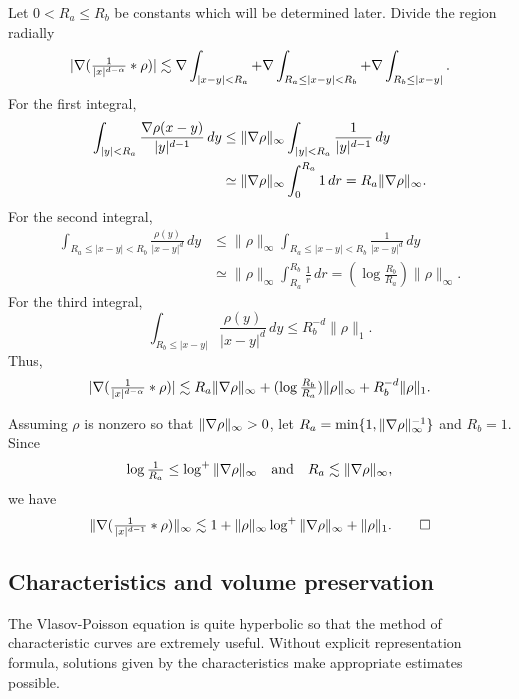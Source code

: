 \documentclass[11pt]{amsart}
\begin{document}
\begin{pfs}
\item
Let $0<R_a\le R_b$ be constants which will be determined later.
Divide the region radially
\begin{align*}
|\nabla(\tfrac1{|x|^{d-\alpha}}*\rho)|\lesssim\nabla\int_{|x-y|<R_a}+\nabla\int_{R_a\le|x-y|<R_b}+\nabla\int_{R_b\le|x-y|}.
\end{align*}
For the first integral,
\begin{align*}
\int_{|y|<R_a}\frac{\nabla\rho(x-y)}{|y|^{d-1}}\,dy
&\le\|\nabla\rho\|_\infty\int_{|y|<R_a}\frac1{|y|^{d-1}}\,dy\\
&\simeq\|\nabla\rho\|_\infty\int_0^{R_a}1\,dr
=R_a\|\nabla\rho\|_\infty.
\end{align*}
For the second integral,
\begin{align*}
\int_{R_a\le|x-y|<R_b}\frac{\rho(y)}{|x-y|^d}\,dy
&\le\|\rho\|_\infty\int_{R_a\le|x-y|<R_b}\frac1{|x-y|^d}\,dy\\
&\simeq\|\rho\|_\infty\int_{R_a}^{R_b}\frac1r\,dr
=(\log\tfrac{R_b}{R_a})\|\rho\|_\infty.
\end{align*}
For the third integral,
\[\int_{R_b\le|x-y|}\frac{\rho(y)}{|x-y|^d}\,dy\le R_b^{-d}\|\rho\|_1.\]
Thus,
\[|\nabla(\tfrac1{|x|^{d-\alpha}}*\rho)|\lesssim R_a\|\nabla\rho\|_\infty+(\log\tfrac{R_b}{R_a})\|\rho\|_\infty+R_b^{-d}\|\rho\|_1.\]

Assuming $\rho$ is nonzero so that $\|\nabla\rho\|_\infty>0$, let $R_a=\min\{1,\|\nabla\rho\|_\infty^{-1}\}$ and $R_b=1$.
Since
\[\log\tfrac1{R_a}\le\log^+\|\nabla\rho\|_\infty\quad\text{and}\quad R_a\lesssim\|\nabla\rho\|_\infty,\]
we have
\[\|\nabla(\tfrac1{|x|^{d-1}}*\rho)\|_\infty\lesssim1+\|\rho\|_\infty\log^+\|\nabla\rho\|_\infty+\|\rho\|_1.\qedhere\]
\end{pfs}

\subsection{Characteristics and volume preservation}

The Vlasov-Poisson equation is quite hyperbolic so that the method of characteristic curves are extremely useful.
Without explicit representation formula, solutions given by the characteristics make appropriate estimates possible.
\end{document}
